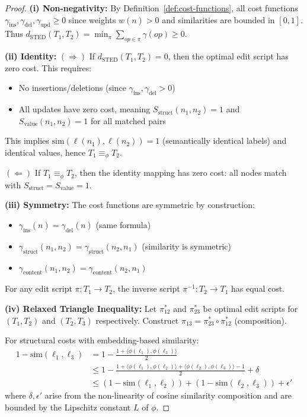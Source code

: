\documentclass{article}
\begin{document}
\begin{proof}
\textbf{(i) Non-negativity:} By Definition~\ref{def:cost-functions}, all cost functions $\gamma_{\text{ins}}, \gamma_{\text{del}}, \gamma_{\text{upd}} \geq 0$ since weights $w(n) > 0$ and similarities are bounded in $[0,1]$. Thus $d_{\text{STED}}(T_1, T_2) = \min_\pi \sum_{op \in \pi} \gamma(op) \geq 0$.

\textbf{(ii) Identity:}
$(\Rightarrow)$ If $d_{\text{STED}}(T_1, T_2) = 0$, then the optimal edit script has zero cost. This requires:
\begin{itemize}
    \item No insertions/deletions (since $\gamma_{\text{ins}}, \gamma_{\text{del}} > 0$)
    \item All updates have zero cost, meaning $S_{\text{struct}}(n_1, n_2) = 1$ and $S_{\text{value}}(n_1, n_2) = 1$ for all matched pairs
\end{itemize}
This implies $\text{sim}(\ell(n_1), \ell(n_2)) = 1$ (semantically identical labels) and identical values, hence $T_1 \equiv_\phi T_2$.

$(\Leftarrow)$ If $T_1 \equiv_\phi T_2$, then the identity mapping has zero cost: all nodes match with $S_{\text{struct}} = S_{\text{value}} = 1$.

\textbf{(iii) Symmetry:} The cost functions are symmetric by construction:
\begin{itemize}
    \item $\gamma_{\text{ins}}(n) = \gamma_{\text{del}}(n)$ (same formula)
    \item $\gamma_{\text{struct}}(n_1, n_2) = \gamma_{\text{struct}}(n_2, n_1)$ (similarity is symmetric)
    \item $\gamma_{\text{content}}(n_1, n_2) = \gamma_{\text{content}}(n_2, n_1)$
\end{itemize}
For any edit script $\pi: T_1 \to T_2$, the inverse script $\pi^{-1}: T_2 \to T_1$ has equal cost.

\textbf{(iv) Relaxed Triangle Inequality:} Let $\pi_{12}^*$ and $\pi_{23}^*$ be optimal edit scripts for $(T_1, T_2)$ and $(T_2, T_3)$ respectively. Construct $\pi_{13} = \pi_{23}^* \circ \pi_{12}^*$ (composition).

For structural costs with embedding-based similarity:
\begin{align}
    1 - \text{sim}(\ell_1, \ell_3) &= 1 - \frac{1 + \langle\phi(\ell_1), \phi(\ell_3)\rangle}{2} \\
    &\leq 1 - \frac{1 + \langle\phi(\ell_1), \phi(\ell_2)\rangle + \langle\phi(\ell_2), \phi(\ell_3)\rangle - 1}{2} + \delta \\
    &\leq (1-\text{sim}(\ell_1, \ell_2)) + (1-\text{sim}(\ell_2, \ell_3)) + \epsilon'
\end{align}
where $\delta, \epsilon'$ arise from the non-linearity of cosine similarity composition and are bounded by the Lipschitz constant $L$ of $\phi$.


\end{proof}
\end{document}
